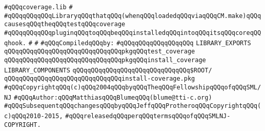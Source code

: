 \label{src/app/debug/test-coverage.lib}
\verb|#qQQqcoverage.lib|\newline
\verb|#|\newline
\verb|#qQQqqQQqqQQqLibraryqQQqthatqQQq(whenqQQqloadedqQQqviaqQQqCM.make)qQQqcausesqQQqtheqQQqtestqQQqcoverage|\newline
\verb|#qQQqqQQqqQQqpluginqQQqtoqQQqbeqQQqinstalledqQQqintoqQQqitsqQQqcoreqQQqhook.|\newline
\verb|#|\newline
\verb|#|\newline
\newline
\verb|#qQQqCompiledqQQqby:|\newline
\verb|#qQQqqQQqqQQqqQQqqQQq|\newline
\newline
\newline
\newline
\verb|LIBRARY_EXPORTS|\newline
\newline
\verb|qQQqqQQqqQQqqQQqqQQqqQQqqQQqqQQqpkgqQQqtest_coverage|\newline
\verb|qQQqqQQqqQQqqQQqqQQqqQQqqQQqqQQqpkgqQQqinstall_coverage|\newline
\newline
\newline
\newline
\verb|LIBRARY_COMPONENTS|\newline
\newline
\verb|qQQqqQQqqQQqqQQqqQQqqQQqqQQqqQQq$ROOT/|\newline
\verb|qQQqqQQqqQQqqQQqqQQqqQQqqQQqqQQqinstall-coverage.pkg|\newline
\newline
\newline
\verb|#qQQqCopyrightqQQq(c)qQQq2004qQQqbyqQQqTheqQQqFellowshipqQQqofqQQqSML/NJ|\newline
\verb|#qQQqAuthor:qQQqMatthiasqQQqBlumeqQQq(blume@tti-c.org)|\newline
\verb|#qQQqSubsequentqQQqchangesqQQqbyqQQqJeffqQQqProtheroqQQqCopyrightqQQq(c)qQQq2010-2015,|\newline
\verb|#qQQqreleasedqQQqperqQQqtermsqQQqofqQQqSMLNJ-COPYRIGHT.|\newline

